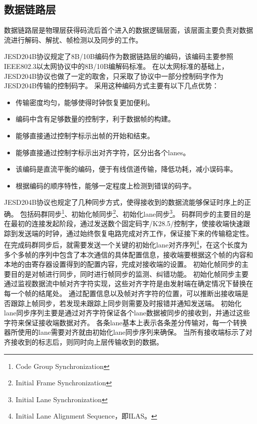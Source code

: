 \documentclass[UTF8]{ctexart}
\begin{document}
\subsection{数据链路层}

数据链路层是物理层获得码流后首个进入的数据逻辑层面，该层面主要负责对数据流进行解码、解扰、帧检测以及同步的工作。

JESD204B协议规定了8B/10B编码作为数据链路层的编码，该编码主要参照IEEE802.3以太网协议中的8B/10B编解码标准。
在以太网标准的基础上，JESD204B协议也做了一定的取舍，只采取了协议中一部分控制码字作为JESD204B传输的控制码字。
采用这种编码方式主要有以下几点优势：

\begin{itemize}
\item 传输密度均匀，能够使得时钟恢复更加便利。
\item 编码中含有足够数量的控制字，利于数据帧的构建。
\item 能够直接通过控制字标示出帧的开始和结束。
\item 能够直接通过控制字标示出对齐字符，区分出各个lanes。
\item 该编码是直流平衡的编码，便于有线信道传输，降低功耗，减小误码率。
\item 根据编码的顺序特性，能够一定程度上检测到错误的码字。
\end{itemize}

JESD204B协议也规定了几种同步方式，使得接收到的数据流能够保证时序上的正确。
包括码群同步\footnote{Code Group Synchronization}、初始化帧同步\footnote{Initial Frame Synchronization}、初始化lane同步\footnote{Initial Lane Synchronization}。
码群同步的主要目的是在最初的连接发起阶段，通过发送数个固定码字/K28.5/控制字，使接收端快速跟踪到发送端的时钟，通过始终恢复电路完成对齐工作，保证接下来的传输稳定性。
在完成码群同步后，就需要发送一个关键的初始化lane对齐序列\footnote{Initial Lane Alignment Sequence，即ILAS。}，在这个长度为多个多帧的序列中包含了本次通信的具体配置信息，接收端要根据这个帧的内容和本地的由寄存器设置得到的配置内容，完成对接收端的设置。
初始化帧同步的主要目的是对帧进行同步，同时进行帧同步的监测、纠错功能。
初始化帧同步主要通过监视数据流中帧对齐字符实现，这些对齐字符是由发射端在确定情况下替换在每一个帧的结尾处。
通过配置信息以及帧对齐字符的位置，可以推断出接收端是否跟踪上帧同步，若发现未跟踪上同步则需要及时报错并通知发送端。
初始化lane同步序列主要是通过对齐字符保证各个lane数据被同步的接收到，并通过这些字符来保证接收端数据对齐。
各条lane基本上表示各条差分传输对，每一个转换器所使用的lane需要对齐就由初始化lane同步序列来确保。
当所有接收端标示了对齐接收到的标志后，则同时向上层传输收到的数据。
\end{document}
